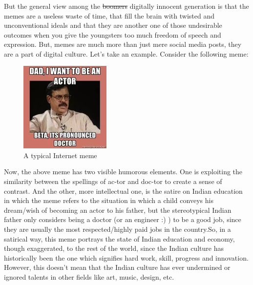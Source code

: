 \documentclass{article}
\begin{document}
But the general view among the \st{boomers} digitally innocent generation is that the memes are a useless waste of time, that fill the brain with twisted and unconventional ideals and that they are another one of those undesirable outcomes when you give the youngsters too much freedom of speech and expression. But, memes are much more than just mere social media posts, they are a part of digital culture. Let's take an example. Consider the following meme:

\begin{figure}[H]
    \centering
    \includegraphics[width=0.4\textwidth]{figures/meme1.png}
    \caption{A typical Internet meme}
\end{figure}

Now, the above meme has two visible humorous elements. One is exploiting the similarity between the spellings of ac-tor and doc-tor to create a sense of contrast. And the other, more intellectual one, is the satire on Indian education in which the meme refers to the situation in which a child conveys his dream/wish of becoming an actor to his father, but the stereotypical Indian father only considers being a doctor (or an engineer :) ) to be a good job, since they are usually the most respected/highly paid jobs in the country.So, in a satirical way, this meme portrays the state of Indian education and economy, though exaggerated, to the rest of the world, since the Indian culture has historically been the one which signifies hard work, skill, progress and innovation. However, this doesn't mean that the Indian culture has ever undermined or ignored talents in other fields like art, music, design, etc. 
\end{document}
